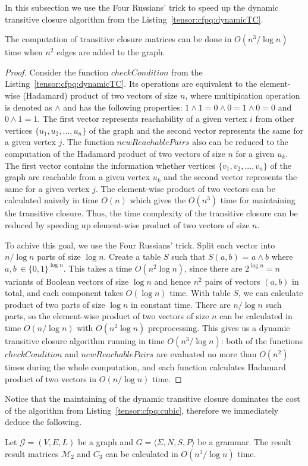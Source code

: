 In this subsection we use the Four Russians' trick to speed up the dynamic transitive closure algorithm from the Listing~\ref{tensor:cfpq:dynamicTC}.
\begin{theorem}{}
    The computation of transitive closure matrices can be done in $O(n^3/\log n)$ time when $n^2$ edges are added to the graph.
\end{theorem}
\begin{proof}
Consider the function $checkCondition$ from the Listing~\ref{tensor:cfpq:dynamicTC}. Its operations are equivalent to the element-wise (Hadamard) product of two vectors of size $n$, where multipication operation is denoted as $\wedge$ and has the following properties: $1 \wedge 1 = 0 \wedge 0 = 1 \wedge 0 = 0$ and $0 \wedge 1 = 1$. The first vector represents reachability of a given vertex $i$ from other vertices $\{u_1, u_2, ..., u_n\}$ of the graph and the second vector represents the same for a given vertex $j$. The function $newReachablePairs$ also can be reduced to the computation of the Hadamard product of two vectors of size $n$ for a given $u_k$. The first vector contains the information whether vertices  $\{v_1, v_2, ..., v_n\}$ of the graph are reachable from a given vertex $u_k$ and the second vector represents the same for a given vertex $j$. The element-wise product of two vectors can be calculated naively in time $O(n)$ which gives the $O(n^3)$ time for maintaining the transitive closure. Thus, the time complexity of the transitive closure can be reduced by speeding up element-wise product of two vectors of size $n$. 


To achive this goal, we use the Four Russians' trick. Split each vector into $n/\log n$ parts of size $\log n$. Create a table $S$ such that $S(a, b)$ = $a \wedge b$ where $a, b \ \in {\{0,1\}}^{\log n}$. This takes a time $O(n^2 \log n)$, since there are $2^{\log n} = n$ variants of Boolean vectors of size $\log n$ and hence $n^2$ pairs of vectors $(a, b)$ in total, and each component takes $O(\log n)$ time. With table $S$, we can calculate product of two parts of size $\log n$ in constant time. There are $n/\log n$ such parts, so the element-wise product of two vectors of size $n$ can be calculated in time $O(n/\log n)$ with $O(n^2 \log n)$ preprocessing. This gives us a dynamic transitive closure algorithm running in time $O(n^3/\log n)$: both of the functions $checkCondition$ and  $newReachablePairs$ are evaluated no more than $O(n^2)$ times during the whole computation, and each function calculates Hadamard product of two vectors in $O(n/\log n)$ time.
\end{proof} 
Notice that the maintaining of the dynamic transitive closure dominates the cost of the algorithm from Listing~\ref{tensor:cfpq:cubic}, therefore we immediately deduce the following.
\begin{corollary}{}
    Let $\mathcal{G} = (V,E,L)$ be a graph and $G = \langle\Sigma, N, S, P\rangle$ be a grammar.
    The result result matrices $\mathcal{M}_2$ and $C_3$ can be calculated in $O(n^3/\log n)$ time.
\end{corollary}


